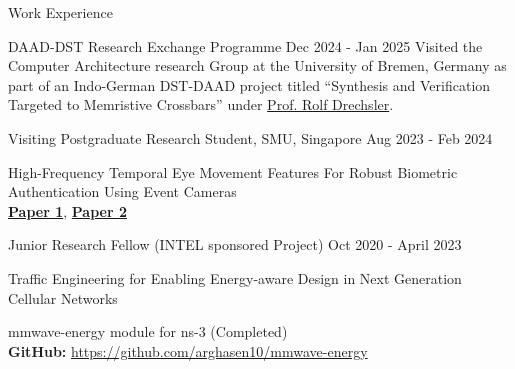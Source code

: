 \documentclass{resume} %
\begin{document}
	
	\begin{rSection}{Work Experience}
		
		\begin{rSubsection}{DAAD-DST Research Exchange Programme}
			{Dec 2024 - Jan 2025}{}{}
			Visited  the Computer Architecture  research Group at the University of Bremen, Germany as part of an Indo-German DST-DAAD project titled “Synthesis and Verification Targeted to Memristive Crossbars” under \href{https://www.rolfdrechsler.de/}{Prof. Rolf Drechsler}.
		\end{rSubsection}
		\begin{rSubsection}{Visiting Postgraduate Research Student, SMU, Singapore}  
			{Aug 2023 - Feb 2024}{}{}
			\item High-Frequency Temporal Eye Movement Features For Robust Biometric Authentication Using Event Cameras\\
			\href{https://dl.acm.org/doi/abs/10.1145/3699745}{\textbf{Paper 1}}, 
		    \href{https://eye-tracking-for-physiological-sensing.github.io/eyegraph/}{\textbf{Paper 2}}
		\end{rSubsection}
		
		
		\begin{rSubsection}{Junior Research Fellow (INTEL sponsored Project)}  
			{Oct 2020 - April 2023}{}{}
				\item Traffic Engineering for Enabling Energy-aware Design in Next Generation Cellular Networks
				\item mmwave-energy module for ns-3 (Completed)\\
				\textbf{GitHub:} \url{https://github.com/arghasen10/mmwave-energy}
		\end{rSubsection}
		

\end{rSection}
\end{document}
